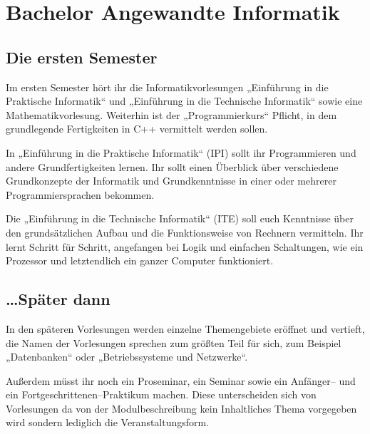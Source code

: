 \section{Bachelor Angewandte Informatik}

\subsection{Die ersten Semester}

Im ersten Semester hört ihr die Informatikvorlesungen „Einführung in die Praktische Informatik“ und „Einführung in die Technische Informatik“ sowie eine Mathematikvorlesung. Weiterhin ist der „Programmierkurs“ Pflicht, in dem grundlegende Fertigkeiten in C++ vermittelt werden sollen.

In „Einführung in die Praktische Informatik“ (IPI) sollt ihr Programmieren und andere Grundfertigkeiten lernen. Ihr sollt einen Überblick über verschiedene Grundkonzepte der Informatik und Grundkenntnisse in einer oder mehrerer Programmiersprachen bekommen.

Die „Einführung in die Technische Informatik“ (ITE) soll euch Kenntnisse über den grundsätzlichen Aufbau und die Funktionsweise von Rechnern vermitteln. Ihr lernt Schritt für Schritt, angefangen bei Logik und einfachen Schaltungen, wie ein Prozessor und letztendlich ein ganzer Computer funktioniert.


\subsection{\dots{}Später dann}

In den späteren Vorlesungen werden einzelne Themengebiete eröffnet und vertieft, die Namen der Vorlesungen sprechen zum größten Teil für sich, zum Beispiel „Datenbanken“ oder „Betriebssysteme und Netzwerke“.

Außerdem müsst ihr noch ein Proseminar, ein Seminar sowie ein An\-fän\-ger-- und ein Fortgeschrittenen--Praktikum machen. Diese unterscheiden sich von Vorlesungen da von der Modulbeschreibung kein Inhaltliches Thema vorgegeben wird sondern lediglich die Veranstaltungsform.

